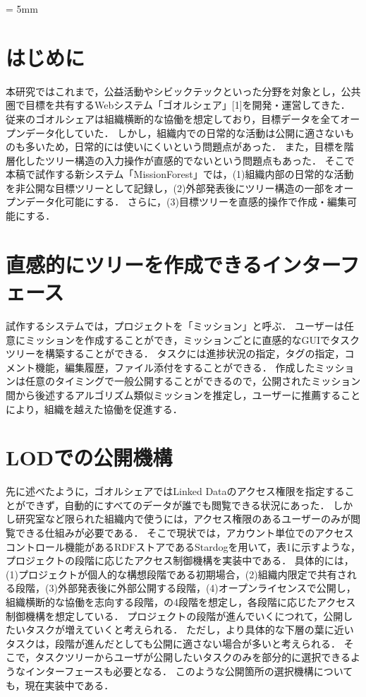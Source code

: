 \documentclass[a4j,twoside]{jarticle}
\begin{document}
\twocolumn[\vspace*{9mm}]     %
\begin{論文概要}              %
\setcounter{page}{1}          %
\baselineskip = 5mm

\section{はじめに}
本研究ではこれまで，公益活動やシビックテックといった分野を対象とし，公共圏で目標を共有するWebシステム「ゴオルシェア」[1]を開発・運営してきた．
従来のゴオルシェアは組織横断的な協働を想定しており，目標データを全てオープンデータ化していた．
しかし，組織内での日常的な活動は公開に適さないものも多いため，日常的には使いにくいという問題点があった．
また，目標を階層化したツリー構造の入力操作が直感的でないという問題点もあった．
そこで本稿で試作する新システム「MissionForest」では，(1)組織内部の日常的な活動を非公開な目標ツリーとして記録し，(2)外部発表後にツリー構造の一部をオープンデータ化可能にする．
さらに，(3)目標ツリーを直感的操作で作成・編集可能にする．

\section{直感的にツリーを作成できるインターフェース}
試作するシステムでは，プロジェクトを「ミッション」と呼ぶ．
ユーザーは任意にミッションを作成することができ，ミッションごとに直感的なGUIでタスクツリーを構築することができる．
タスクには進捗状況の指定，タグの指定，コメント機能，編集履歴，ファイル添付をすることができる．
作成したミッションは任意のタイミングで一般公開することができるので，公開されたミッション間から後述するアルゴリズム類似ミッションを推定し，ユーザーに推薦することにより，組織を越えた協働を促進する．

\section{LODでの公開機構}
先に述べたように，ゴオルシェアではLinked Dataのアクセス権限を指定することができず，自動的にすべてのデータが誰でも閲覧できる状況にあった．
しかし研究室など限られた組織内で使うには，アクセス権限のあるユーザーのみが閲覧できる仕組みが必要である．
そこで現状では，アカウント単位でのアクセスコントロール機能があるRDFストアであるStardogを用いて，表1に示すような，プロジェクトの段階に応じたアクセス制御機構を実装中である．
具体的には，(1)プロジェクトが個人的な構想段階である初期場合，(2)組織内限定で共有される段階，(3)外部発表後に外部公開する段階，(4)オープンライセンスで公開し，組織横断的な協働を志向する段階，の4段階を想定し，各段階に応じたアクセス制御機構を想定している．
プロジェクトの段階が進んでいくにつれて，公開したいタスクが増えていくと考えられる．
ただし，より具体的な下層の葉に近いタスクは，段階が進んだとしても公開に適さない場合が多いと考えられる．
そこで，タスクツリーからユーザが公開したいタスクのみを部分的に選択できるようなインターフェースも必要となる．
このような公開箇所の選択機構についても，現在実装中である．


\end{論文概要}
\end{document}
